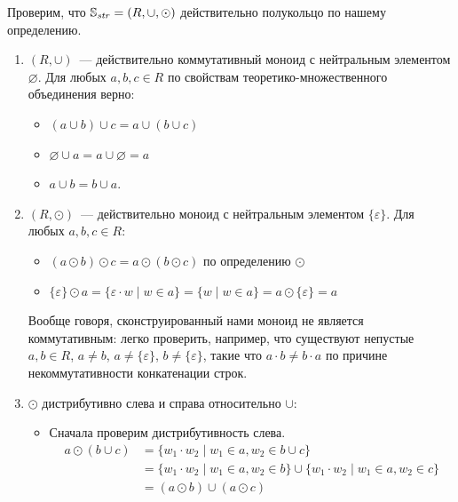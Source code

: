 \begin{example}
    Проверим, что $\mathbb{S}_{\mathit{str}} = (R, \cup, \odot)$ действительно полукольцо по нашему определению.
    \begin{enumerate}
        \item $(R, \cup)$~--- действительно коммутативный моноид с нейтральным элементом $\varnothing$.
              Для любых $a, b, c \in R$ по свойствам теоретико-множественного объединения верно:
              \begin{itemize}
                  \item $(a \cup b) \cup c = a \cup (b \cup c)$
                  \item $\varnothing \cup a = a \cup \varnothing = a$
                  \item $a \cup b = b \cup a$.
              \end{itemize}
        \item $(R, \odot)$~--- действительно моноид с нейтральным элементом $\{\varepsilon\}$.
              Для любых $a, b, c \in R$:
              \begin{itemize}
                  \item $(a \odot b) \odot c = a \odot (b \odot c)$ по определению $\odot$
                  \item $\{\varepsilon\} \odot a = \{\varepsilon \cdot w \mid w \in a \} = \{w \mid w \in a \} = a \odot \{\varepsilon\} = a$
              \end{itemize}
              Вообще говоря, сконструированный нами моноид не является коммутативным: легко проверить, например, что существуют непустые $a, b \in R$, $a \neq b$, $a \neq \{\varepsilon\}$, $b \neq \{\varepsilon\}$, такие что $a \cdot b \neq b \cdot a$ по причине некоммутативности конкатенации строк.
        \item $\odot$ дистрибутивно слева и справа относительно $\cup$:
              \begin{itemize}
                  \item Сначала проверим дистрибутивность слева.
                        \begin{align*}
                            a \odot (b \cup c) & = \{ w_1 \cdot w_2 \mid  w_1 \in a, w_2 \in b \cup c\}                                                \\
                                               & = \{ w_1 \cdot w_2 \mid  w_1 \in a, w_2 \in b \} \cup  \{ w_1 \cdot w_2 \mid  w_1 \in a, w_2 \in c \} \\
                                               & =  (a \odot b) \cup (a \odot c)

\end{align*}
\end{itemize}
\end{enumerate}
\end{example}
